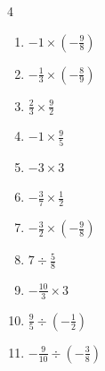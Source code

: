 \begin{multicols}{4}
\begin{enumerate}
  \item $\displaystyle -1\times{}\left(-\frac{9}{8}\right)$


\columnbreak %

  \item $\displaystyle -\frac{1}{3}\times{}\left(-\frac{8}{9}\right)$


  \item $\displaystyle \frac{2}{3}\times{}\frac{9}{2}$

        \phantom{$\displaystyle =3$}

  \item $\displaystyle -1\times{}\frac{9}{5}$


  \item $\displaystyle -3\times{}3$

        \phantom{$\displaystyle =-9$}

  \item $\displaystyle -\frac{3}{7}\times{}\frac{1}{2}$


  \item $\displaystyle -\frac{3}{2}\times{}\left(-\frac{9}{8}\right)$


  \item $\displaystyle 7\div{}\frac{5}{8}$


  \item $\displaystyle -\frac{10}{3}\times{}3$

        \phantom{$\displaystyle =-10$}

  \item $\displaystyle \frac{9}{5}\div{}\left(-\frac{1}{2}\right)$


  \item $\displaystyle -\frac{9}{10}\div{}\left(-\frac{3}{8}\right)$


\columnbreak %

\resetques


\end{enumerate}
\end{multicols}
